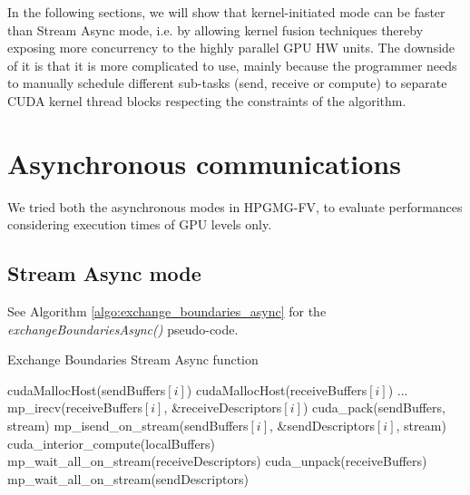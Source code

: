 \documentclass[conference]{IEEEtran}
\begin{document}

In the following sections, we will show that kernel-initiated mode can be faster than Stream Async mode, i.e. by allowing kernel fusion techniques thereby exposing more concurrency to the highly parallel GPU HW units. The downside of it is that it is more complicated to use, mainly because the programmer needs to manually schedule different sub-tasks (send, receive or compute) to separate CUDA kernel thread blocks respecting the constraints of the algorithm.



\section{Asynchronous communications}\label{sec:gpudirect_async_hpgmg}

We tried both the asynchronous modes in HPGMG-FV, to evaluate performances considering execution times of GPU levels only.

\subsection{Stream Async mode}

See Algorithm \ref{algo:exchange_boundaries_async} for the \textit{exchangeBoundariesAsync()} pseudo-code.

\begin{algorithm}
\small
\caption{Exchange Boundaries Stream Async function}
\label{algo:exchange_boundaries_async}
\begin{algorithmic}[1]
\State cudaMallocHost(sendBuffers$[i]$)
\State cudaMallocHost(receiveBuffers$[i]$)
\EndFor
\State ...
 \label{alg:a}
		\State mp\_irecv(receiveBuffers$[i]$, \&receiveDescriptors$[i]$)    
	\EndFor
	\State cuda\_pack(sendBuffers, stream)
		\State mp\_isend\_on\_stream(sendBuffers$[i]$, \&sendDescriptors$[i]$, stream)    
	\EndFor
	\State cuda\_interior\_compute(localBuffers)
	\State mp\_wait\_all\_on\_stream(receiveDescriptors)
	\State cuda\_unpack(receiveBuffers)
	\State mp\_wait\_all\_on\_stream(sendDescriptors)
\EndFunction
\end{algorithmic}
\end{algorithm}
\end{document}
